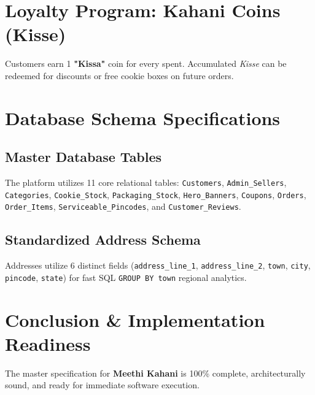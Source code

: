 \documentclass[11pt,a4paper]{article}
\begin{document}
\section{Loyalty Program: Kahani Coins (Kisse)}
Customers earn 1 \textbf{"Kissa"} coin for every  spent. Accumulated \textit{Kisse} can be redeemed for discounts or free cookie boxes on future orders.

\section{Database Schema Specifications}
\subsection{Master Database Tables}
The platform utilizes 11 core relational tables: \texttt{Customers}, \texttt{Admin\_Sellers}, \texttt{Categories}, \texttt{Cookie\_Stock}, \texttt{Packaging\_Stock}, \texttt{Hero\_Banners}, \texttt{Coupons}, \texttt{Orders}, \texttt{Order\_Items}, \texttt{Serviceable\_Pincodes}, and \texttt{Customer\_Reviews}.

\subsection{Standardized Address Schema}
Addresses utilize 6 distinct fields (\texttt{address\_line\_1}, \texttt{address\_line\_2}, \texttt{town}, \texttt{city}, \texttt{pincode}, \texttt{state}) for fast SQL \texttt{GROUP BY town} regional analytics.

\section{Conclusion \& Implementation Readiness}
The master specification for \textbf{Meethi Kahani} is 100\% complete, architecturally sound, and ready for immediate software execution.
\end{document}
